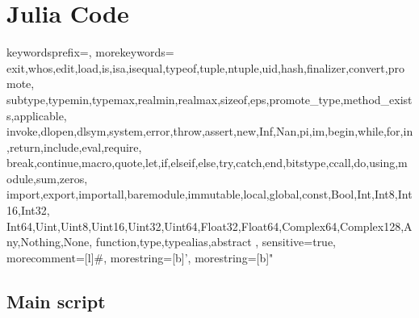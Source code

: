 \chapter{Julia Code}






{
  keywordsprefix=\@,
  morekeywords={
    exit,whos,edit,load,is,isa,isequal,typeof,tuple,ntuple,uid,hash,finalizer,convert,promote,
    subtype,typemin,typemax,realmin,realmax,sizeof,eps,promote_type,method_exists,applicable,
    invoke,dlopen,dlsym,system,error,throw,assert,new,Inf,Nan,pi,im,begin,while,for,in,return,include,eval,require,
    break,continue,macro,quote,let,if,elseif,else,try,catch,end,bitstype,ccall,do,using,module,sum,zeros,
    import,export,importall,baremodule,immutable,local,global,const,Bool,Int,Int8,Int16,Int32,
    Int64,Uint,Uint8,Uint16,Uint32,Uint64,Float32,Float64,Complex64,Complex128,Any,Nothing,None,
    function,type,typealias,abstract
  },
  sensitive=true,
  morecomment=[l]{\#},
  morestring=[b]',
  morestring=[b]" 
}


\section{Main script}
